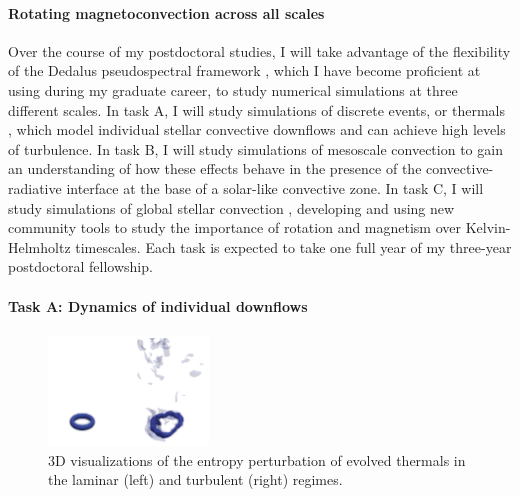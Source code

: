 \documentclass[11pt, preprint]{aastex}
\begin{document}
\paragraph{Rotating magnetoconvection across all scales}
Over the course of my postdoctoral studies, I will take advantage of the flexibility of the Dedalus pseudospectral framework \citep{burns&all2019}, which I have become proficient at using during my graduate career, to study numerical simulations at three different scales.
In task A, I will study simulations of discrete events, or thermals \citep[as in][]{andersLB2019}, which model individual stellar convective downflows and can achieve high levels of turbulence.
In task B, I will study simulations of mesoscale convection \citep[as in][]{anders&brown2017} to gain an understanding of how these effects behave in the presence of the convective-radiative interface at the base of a solar-like convective zone.
In task C, I will study simulations of global stellar convection \citep[as in][]{lecoanet&all2018}, developing and using new community tools to study the importance of rotation and magnetism over Kelvin-Helmholtz timescales.
Each task is expected to take one full year of my three-year postdoctoral fellowship.

\vspace{-0.5cm}
\paragraph{Task A: Dynamics of individual downflows}
\label{sct:taskA}
\begin{figure}
	\begin{center}
	\vspace{-10pt}
    \includegraphics[width=0.38\textwidth]{./figs/thermals_comparison.png}
	\vspace{-15pt}
	\end{center}
    \caption{
	3D visualizations of the entropy perturbation of evolved thermals in the laminar (left) and turbulent (right) regimes.
	\label{fig:thermals_comparison} }
\end{figure}
\end{document}
